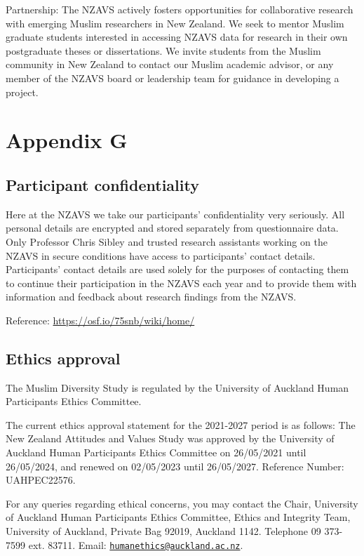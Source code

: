 \documentclass[
]{interact}
\begin{document}
\noindent Partnership: The NZAVS actively fosters opportunities for
collaborative research with emerging Muslim researchers in New Zealand.
We seek to mentor Muslim graduate students interested in accessing NZAVS
data for research in their own postgraduate theses or dissertations. We
invite students from the Muslim community in New Zealand to contact our
Muslim academic advisor, or any member of the NZAVS board or leadership
team for guidance in developing a project.

\newpage{}

\section{Appendix G}\label{appendix-g}

\subsection{Participant
confidentiality}\label{participant-confidentiality}

\noindent Here at the NZAVS we take our participants' confidentiality
very seriously. All personal details are encrypted and stored separately
from questionnaire data. Only Professor Chris Sibley and trusted
research assistants working on the NZAVS in secure conditions have
access to participants' contact details. Participants' contact details
are used solely for the purposes of contacting them to continue their
participation in the NZAVS each year and to provide them with
information and feedback about research findings from the NZAVS.

\noindent Reference: \url{https://osf.io/75snb/wiki/home/}

\subsection{Ethics approval}\label{ethics-approval}

\noindent The Muslim Diversity Study is regulated by the University of
Auckland Human Participants Ethics Committee.

\noindent The current ethics approval statement for the 2021-2027 period
is as follows: The New Zealand Attitudes and Values Study was approved
by the University of Auckland Human Participants Ethics Committee on
26/05/2021 until 26/05/2024, and renewed on 02/05/2023 until 26/05/2027.
Reference Number: UAHPEC22576.

\noindent For any queries regarding ethical concerns, you may contact
the Chair, University of Auckland Human Participants Ethics Committee,
Ethics and Integrity Team, University of Auckland, Private Bag 92019,
Auckland 1142. Telephone 09 373-7599 ext. 83711. Email:
\href{mailto:humanethics@auckland.ac.nz}{\nolinkurl{humanethics@auckland.ac.nz}}.
\end{document}
